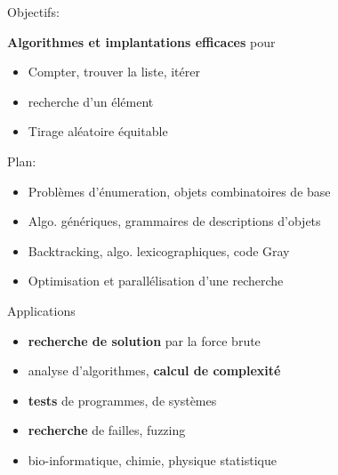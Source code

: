 \documentclass[12pt]{beamer}
\begin{document}
\begin{frame}{Objectifs:}

  \begin{tcolorbox}
    \textbf{Algorithmes et implantations efficaces} pour
    \begin{itemize}
    \item Compter, trouver la liste, itérer
    \medskip
    \item recherche d'un élément
    \medskip
    \item Tirage aléatoire équitable
    \end{itemize}
  \end{tcolorbox}
  \bigskip\pause

  Plan:
  \begin{itemize}
  \item Problèmes d'énumeration, objets combinatoires de base
    \smallskip

  \item Algo. génériques, grammaires de descriptions d'objets
    \smallskip

  \item Backtracking, algo. lexicographiques, code Gray
    \smallskip

  \item Optimisation et parallélisation d'une recherche
  \end{itemize}
\end{frame}


\begin{frame}{Applications}

  \begin{itemize}
  \item \textbf{recherche de solution} par la force brute
    \bigskip

  \item analyse d'algorithmes, \textbf{calcul de complexité}
    \bigskip

  \item \textbf{tests} de programmes, de systèmes
    \bigskip

  \item \textbf{recherche} de failles, fuzzing
    \bigskip

  \item bio-informatique, chimie, physique statistique
  \end{itemize}
\end{frame}
\end{document}
